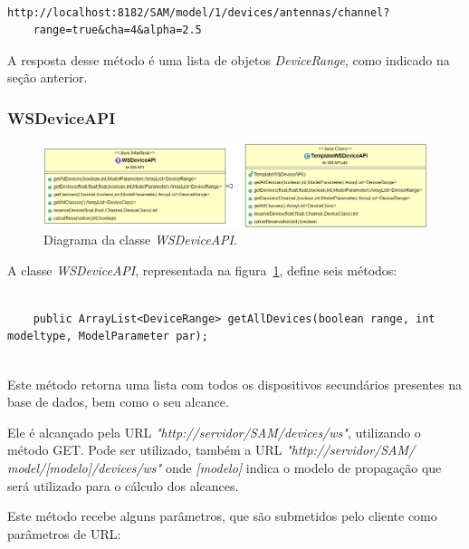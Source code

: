 \begin{lstlisting}			

http://localhost:8182/SAM/model/1/devices/antennas/channel?
	range=true&cha=4&alpha=2.5

\end{lstlisting}


A resposta desse método é uma lista de objetos \textit{DeviceRange}, como indicado na seção anterior.


\subsubsection{WSDeviceAPI}

\begin{figure}[htb]
\centering
\includegraphics[width=1.0\textwidth]{figs/wsdeviceapi}
\caption[\textit{Diagrama da classe \textit{WSDeviceAPI} }.]
{Diagrama da classe \textit{WSDeviceAPI}.}
\label{fig:WSDeviceAPI}
\end{figure} 


\FloatBarrier


A classe \textit{WSDeviceAPI}, representada na figura~\ref{fig:WSDeviceAPI}, define seis métodos:

\begin{lstlisting}

	public ArrayList<DeviceRange> getAllDevices(boolean range, int modeltype, ModelParameter par);


\end{lstlisting}


Este método retorna uma lista com todos os dispositivos secundários presentes na base de dados, bem como o seu alcance.

Ele é alcançado pela URL \textit{"http://servidor/SAM/devices/ws"}, utilizando o método GET. Pode ser utilizado, também a URL \textit{"http://servidor/SAM/ model/[modelo]/devices/ws"} onde \textit{[modelo]} indica o modelo de propagação que será utilizado para o cálculo dos alcances.

Este método recebe alguns parâmetros, que são submetidos pelo cliente como parâmetros de URL:

